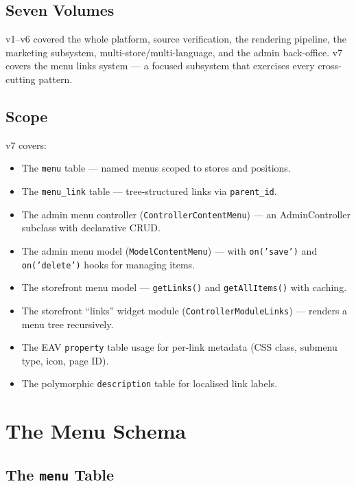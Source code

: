 \documentclass[11pt,a4paper]{article}
\begin{document}
\subsection{Seven Volumes}

v1--v6 covered the whole platform, source verification, the rendering
pipeline, the marketing subsystem, multi-store/multi-language, and the
admin back-office. v7 covers the menu links system --- a focused
subsystem that exercises every cross-cutting pattern.

\subsection{Scope}

v7 covers:
\begin{itemize}[leftmargin=1.6em,itemsep=2pt]
  \item The \texttt{menu} table --- named menus scoped to stores and
        positions.
  \item The \texttt{menu\_link} table --- tree-structured links via
        \texttt{parent\_id}.
  \item The admin menu controller (\texttt{ControllerContentMenu}) ---
        an AdminController subclass with declarative CRUD.
  \item The admin menu model (\texttt{ModelContentMenu}) --- with
        \texttt{on('save')} and \texttt{on('delete')} hooks for
        managing items.
  \item The storefront menu model --- \texttt{getLinks()} and
        \texttt{getAllItems()} with caching.
  \item The storefront ``links'' widget module
        (\texttt{ControllerModuleLinks}) --- renders a menu tree
        recursively.
  \item The EAV \texttt{property} table usage for per-link metadata
        (CSS class, submenu type, icon, page ID).
  \item The polymorphic \texttt{description} table for localised link
        labels.
\end{itemize}

\section{The Menu Schema}\label{sec:schema}

\subsection{The \texttt{menu} Table}
\end{document}
